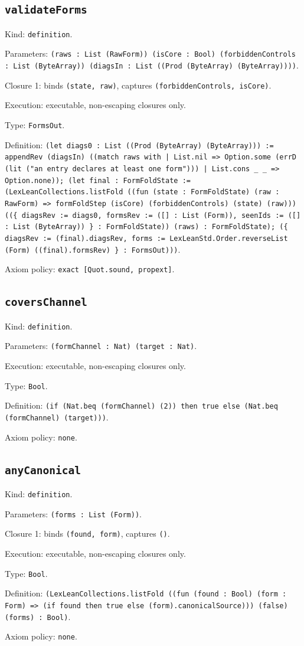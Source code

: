 \documentclass[11pt]{article}
\begin{document}
\subsection*{\texttt{validateForms}}
\noindent Kind: \texttt{definition}.\par
\noindent Parameters: \texttt{(raws : List (RawForm)) (isCore : Bool) (forbiddenControls : List (ByteArray)) (diagsIn : List ((Prod (ByteArray) (ByteArray))))}.\par
\noindent Closure 1: binds \texttt{(state, raw)}, captures \texttt{(forbiddenControls, isCore)}.\par
\noindent Execution: executable, non-escaping closures only.\par
\noindent Type: \texttt{FormsOut}.\par
\noindent Definition: \texttt{(let diags0 : List ((Prod (ByteArray) (ByteArray))) := appendRev (diagsIn) ((match raws with | List.nil => Option.some (errD (lit ("an entry declares at least one form"))) | List.cons \_ \_ => Option.none)); (let final : FormFoldState := (LexLeanCollections.listFold ((fun (state : FormFoldState) (raw : RawForm) => formFoldStep (isCore) (forbiddenControls) (state) (raw))) ((\{ diagsRev := diags0, formsRev := ([] : List (Form)), seenIds := ([] : List (ByteArray)) \} : FormFoldState)) (raws) : FormFoldState); (\{ diagsRev := (final).diagsRev, forms := LexLeanStd.Order.reverseList (Form) ((final).formsRev) \} : FormsOut)))}.\par
\noindent Axiom policy: \texttt{exact [Quot.sound, propext]}.\par
\subsection*{\texttt{coversChannel}}
\noindent Kind: \texttt{definition}.\par
\noindent Parameters: \texttt{(formChannel : Nat) (target : Nat)}.\par
\noindent Execution: executable, non-escaping closures only.\par
\noindent Type: \texttt{Bool}.\par
\noindent Definition: \texttt{(if (Nat.beq (formChannel) (2)) then true else (Nat.beq (formChannel) (target)))}.\par
\noindent Axiom policy: \texttt{none}.\par
\subsection*{\texttt{anyCanonical}}
\noindent Kind: \texttt{definition}.\par
\noindent Parameters: \texttt{(forms : List (Form))}.\par
\noindent Closure 1: binds \texttt{(found, form)}, captures \texttt{()}.\par
\noindent Execution: executable, non-escaping closures only.\par
\noindent Type: \texttt{Bool}.\par
\noindent Definition: \texttt{(LexLeanCollections.listFold ((fun (found : Bool) (form : Form) => (if found then true else (form).canonicalSource))) (false) (forms) : Bool)}.\par
\noindent Axiom policy: \texttt{none}.\par
\end{document}
